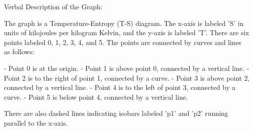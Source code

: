 Verbal Description of the Graph:

The graph is a Temperature-Entropy (T-S) diagram. The x-axis is labeled 'S' in units of kilojoules per kilogram Kelvin, and the y-axis is labeled 'T'. There are six points labeled 0, 1, 2, 3, 4, and 5. The points are connected by curves and lines as follows:

- Point 0 is at the origin.
- Point 1 is above point 0, connected by a vertical line.
- Point 2 is to the right of point 1, connected by a curve.
- Point 3 is above point 2, connected by a vertical line.
- Point 4 is to the left of point 3, connected by a curve.
- Point 5 is below point 4, connected by a vertical line.

There are also dashed lines indicating isobars labeled 'p1' and 'p2' running parallel to the x-axis.